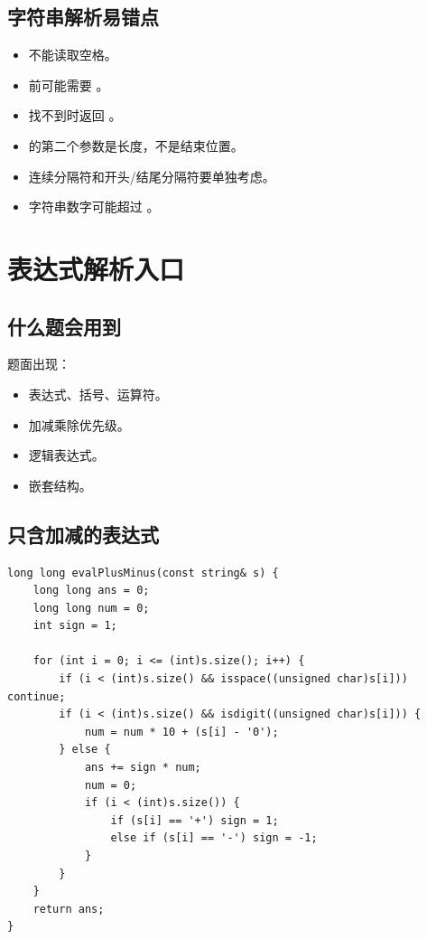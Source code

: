 \subsection{字符串解析易错点}

\begin{itemize}
  \item {} 不能读取空格。
  \item {} 前可能需要 。
  \item {} 找不到时返回 。
  \item {} 的第二个参数是长度，不是结束位置。
  \item 连续分隔符和开头/结尾分隔符要单独考虑。
  \item 字符串数字可能超过 。
\end{itemize}

\section{表达式解析入口}\label{sec:07-22}

\subsection{什么题会用到}

题面出现：

\begin{itemize}
  \item 表达式、括号、运算符。
  \item 加减乘除优先级。
  \item 逻辑表达式。
  \item 嵌套结构。
\end{itemize}

\subsection{只含加减的表达式}

\begin{lstlisting}
long long evalPlusMinus(const string& s) {
    long long ans = 0;
    long long num = 0;
    int sign = 1;

    for (int i = 0; i <= (int)s.size(); i++) {
        if (i < (int)s.size() && isspace((unsigned char)s[i])) continue;
        if (i < (int)s.size() && isdigit((unsigned char)s[i])) {
            num = num * 10 + (s[i] - '0');
        } else {
            ans += sign * num;
            num = 0;
            if (i < (int)s.size()) {
                if (s[i] == '+') sign = 1;
                else if (s[i] == '-') sign = -1;
            }
        }
    }
    return ans;
}
\end{lstlisting}

